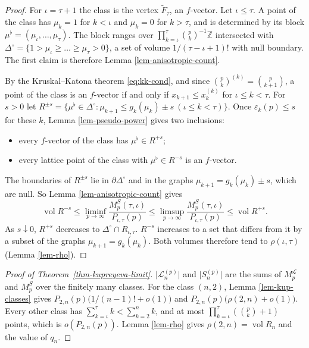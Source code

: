 \documentclass[11pt, a4paper, abstract=yes]{scrartcl}
\theoremstyle{definition}
\theoremstyle{remark}
\theoremstyle{plain}
\theoremstyle{remark}
\theoremstyle{plain}
\newcommand{\vol}{\operatorname{vol}}
\begin{document}
\begin{proof}
For \(\iota=\tau+1\) the class is the vertex \(\tilde F_\tau\), an \(f\)-vector. Let
\(\iota\le\tau\). A point of the class has \(\mu_k=1\) for \(k<\iota\) and \(\mu_k=0\) for
\(k>\tau\), and is determined by its block \(\mu^\flat=(\mu_\iota,\dots,\mu_\tau)\). The block ranges
over \(\prod_{k=\iota}^\tau\binom pk^{-1}\mathbb Z\) intersected with
\(\Delta^\circ=\lbrace1>\mu_\iota\ge\dots\ge\mu_\tau>0\rbrace\), a set of volume
\(1/(\tau-\iota+1)!\) with null boundary. The first claim is therefore
Lemma \ref{lem-anisotropic-count}.

By the Kruskal--Katona theorem \eqref{eq:kk-cond}, and since \(\binom pk^{(k)}=\binom p{k+1}\), a
point of the class is an \(f\)-vector if and only if \(x_{k+1}\le x_k^{(k)}\) for \(\iota\le k<\tau\). For \(s>0\) let
\(R^{\pm s}=\lbrace\mu^\flat\in\Delta^\circ:\mu_{k+1}\le g_k(\mu_k)\pm s\ (\iota\le k<\tau)\rbrace\).
Once \(\varepsilon_k(p)\le s\) for these \(k\), Lemma \ref{lem-pseudo-power} gives two inclusions:
\begin{itemize}
\item every \(f\)-vector of the class has \(\mu^\flat\in R^{+s}\);
\item every lattice point of the class with \(\mu^\flat\in R^{-s}\) is an \(f\)-vector.
\end{itemize}

The boundaries of \(R^{\pm s}\) lie in \(\partial\Delta^\circ\) and in the graphs
\(\mu_{k+1}=g_k(\mu_k)\pm s\), which are null. So Lemma \ref{lem-anisotropic-count} gives
\[
  \vol R^{-s}\le\liminf_{p\to\infty}\frac{M^S_p(\tau,\iota)}{P_{\iota,\tau}(p)}
  \le\limsup_{p\to\infty}\frac{M^S_p(\tau,\iota)}{P_{\iota,\tau}(p)}\le\vol R^{+s}.
\]
As \(s\downarrow0\), \(R^{+s}\) decreases to \(\Delta^\circ\cap R_{\iota,\tau}\). \(R^{-s}\)
increases to a set that differs from it by a subset of the graphs \(\mu_{k+1}=g_k(\mu_k)\). Both
volumes therefore tend to \(\rho(\iota,\tau)\) (Lemma \ref{lem-rho}).
\end{proof}

\begin{proof}[Proof of Theorem~\ref{thm-kupreyeva-limit}]
\(\lvert\mathcal L_n^{(p)}\rvert\) and \(\lvert S_n^{(p)}\rvert\) are the sums of
\(M^{\mathcal L}_p\) and \(M^S_p\) over the finitely many classes. For the class \((n,2)\),
Lemma \ref{lem-kup-classes} gives \(P_{2,n}(p)\bigl(1/(n-1)!+o(1)\bigr)\) and
\(P_{2,n}(p)\bigl(\rho(2,n)+o(1)\bigr)\). Every other class has
\(\sum_{k=\iota}^\tau k<\sum_{k=2}^nk\), and at most \(\prod_{k=\iota}^\tau(\binom pk+1)\) points,
which is \(o(P_{2,n}(p))\). Lemma \ref{lem-rho} gives \(\rho(2,n)=\vol R_n\) and the value of
\(q_n\).
\end{proof}
\end{document}
